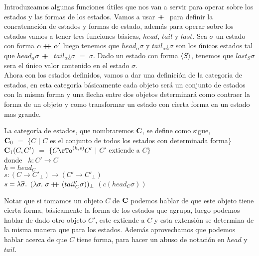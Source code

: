 Introduzcamos algunas funciones \'utiles que nos van a servir para
operar sobre los estados y las formas de los estados. Vamos a usar
$+\kern-1.3ex+\kern0.8ex$ para definir la concatenaci\'on de estados y formas de estado,
adem\'as para operar sobre los estados vamos a tener tres funciones b\'asicas,
$head$, $tail$ y $last$. Sea $\sigma$ un estado con forma $\alpha +\kern-1.3ex+\kern0.8ex \alpha'$
luego tenemos que $head_\alpha \sigma$ y $tail_\alpha¿ \sigma$ son los \'unicos
estados tal que $head_\alpha \sigma$ $+\kern-1.3ex+\kern0.8ex$ $tail_\alpha¿ \sigma$ $=$ $\sigma$.
Dado un estado con forma $\langle S \rangle$, tenemos que $last_S \sigma$ sera el
\'unico valor contenido en el estado $\sigma$.\\

Ahora con los estados definidos, vamos a dar una definici\'on de
la categor\'ia de estados, en esta categor\'ia b\'asicamente cada objeto ser\'a
un conjunto de estados con la misma forma y una flecha entre dos objetos
determinar\'a como contraer la forma de un objeto y como transformar un estado
con cierta forma en un estado mas grande.

\begin{definition}\label{algol:statecategory}
La categor\'ia de estados, que nombraremos $\textbf{C}$, se define como sigue,\\

\indent
$\textbf{C}_0$ $=$ $\{C$ $|$ $C$ es el conjunto de todos los estados con determinada forma$\}$\\
\indent
$\textbf{C}_1(C,C')$ $=$ $\{C \rTo^{(h,s)} C'$ $|$ $C'$ extiende a $C\}$\\

donde \ $h: C' \rightarrow C$\\
\indent \indent \indent
	  $h = head_C$\\
\indent \indent \indent
	  $s: (C \rightarrow C'_{\bot}) \rightarrow (C' \rightarrow C'_{\bot})$\\
\indent \indent \indent
	  $s = \lambda \widehat{\sigma}.$ 
	  	   $(\lambda\sigma. \ \sigma +\kern-1.3ex+\kern0.8ex (tail_C' \sigma))_{\bot}$
	  	   	$(c(head_C \sigma))$

\end{definition}

Notar que si tomamos un objeto $C$ de $\textbf{C}$ podemos hablar de que este objeto
tiene cierta forma, b\'asicamente la forma de los estados que agrupa, luego
podemos hablar de dado otro objeto $C'$, este extiende a $C$ y esta extensi\'on
se determina de la misma manera que para los estados. Adem\'as aprovechamos 
que podemos hablar acerca de que $C$ tiene forma, para hacer un abuso de 
notaci\'on en $head$ y $tail$.\\

